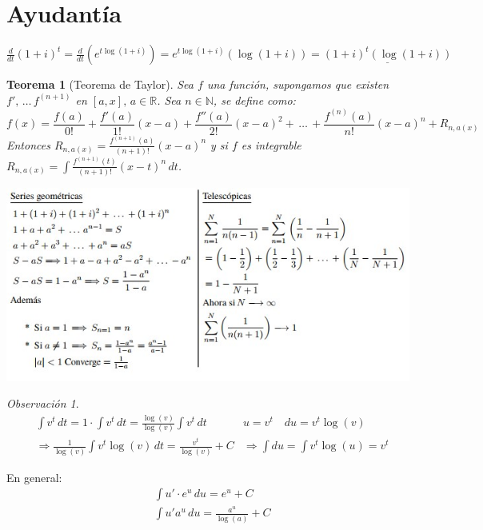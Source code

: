 \documentclass[
]{book}
\newtheorem{theorem}{Teorema}[chapter]
\theoremstyle{definition}
\theoremstyle{definition}
\theoremstyle{definition}
\theoremstyle{definition}
\theoremstyle{remark}
\newtheorem*{remark}{Observación }
\begin{document}
\hypertarget{ayudantuxeda}{%
\section{Ayudantía}\label{ayudantuxeda}}

\(\frac{d}{dt}(1+i)^t = \frac{d}{dt} \left(e^{t\log(1+i)} \right)= e^{t\log(1+i)}\left(\log(1+i)\right) =\underline{(1+i)^t\left( \log(1+i)\right)}\)

\begin{theorem}[Teorema de Taylor]
Sea \(f\) una función, supongamos que existen \(f', \, \ldots \, f^{(n+1)}\) en \([a,x], \, a\in\mathbb{R}\). Sea \(n\in\mathbb{N}\), se define como:
\[f(x) = \frac{f(a)}{0!}+\frac{f'(a)}{1!}(x-a)+\frac{f''(a)}{2!}(x-a)^2 + \, \ldots \, + \frac{f^{(n)}(a)}{n!}(x-a)^n + R_{n, a(x)}\]
Entonces \(R_{n, a(x)} = \frac{f^{(n+1)}(a)}{(n+1)!}(x-a)^n\) y si \(f\) es integrable
\(R_{n, a(x)} = \int\frac{f^{(n+1)}(t)}{(n+1)!}(x-t)^n\, dt\).
\end{theorem}

\includegraphics{images/3.jpg}

\begin{remark}
\begin{align*}
&\int v^t \, dt = 1 \cdot \int v^t \, dt = \frac{\log (v)}{\log (v)}\int v^t \, dt & u = v^t \quad du = v^t \log(v)\\
&\Longrightarrow \frac{1}{\log (v)}\int v^t\log(v) \, dt =\frac{v^t}{\log(v)} + C & \Longrightarrow \int du = \int v^t \log(u) = v^t
\end{align*}

En general:
\begin{align*}
& \int u'\cdot e^{u}\, du = e^{u} + C \\
& \int u'a^{u} \, du = \frac{a^{u}}{\log(a)} + C 
\end{align*}
\end{remark}
\end{document}
